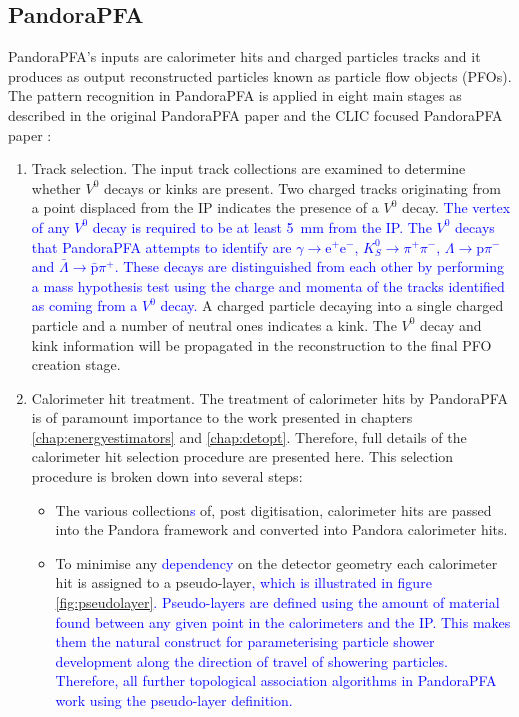 \subsection{PandoraPFA}
PandoraPFA's inputs are calorimeter hits and charged particles tracks and it produces as output reconstructed particles known as particle flow objects (PFOs).  The pattern recognition in PandoraPFA is applied in eight main stages as described in the original PandoraPFA paper \cite{arXiv:0907.3577} and the CLIC focused PandoraPFA paper \cite{arXiv:1209.4039}:
\begin{enumerate}
\item Track selection.  The input track collections are examined to determine whether $V^{0}$ decays or kinks are present.  Two charged tracks originating from a point displaced from the IP indicates the presence of a $V^{0}$ decay.  \textcolor{blue}{The vertex of any $V^{0}$ decay is required to be at least 5~mm from the IP.  The $V^{0}$ decays that PandoraPFA attempts to identify are $\gamma \rightarrow \text{e}^{+}\text{e}^{-}$, $K^{0}_{S} \rightarrow \pi^{+}\pi^{-}$, $\Lambda \rightarrow \text{p}\pi^{-}$ and $\bar{\Lambda} \rightarrow \bar{\text{p}}\pi^{+}$.  These decays are distinguished from each other by performing a mass hypothesis test using the charge and momenta of the tracks identified as coming from a $V^{0}$ decay.} A charged particle decaying into a single charged particle and a number of neutral ones indicates a kink.  The $V^{0}$ decay and kink information will be propagated in the reconstruction to the final PFO creation stage.  
\item Calorimeter hit treatment.  The treatment of calorimeter hits by PandoraPFA is of paramount importance to the work presented in chapters \ref{chap:energyestimators} and \ref{chap:detopt}.  Therefore, full details of the calorimeter hit selection procedure are presented here.  This selection procedure is broken down into several steps:
\begin{itemize}
\item The various collection\textcolor{blue}{s} of, post digitisation, calorimeter hits are passed into the Pandora framework and converted into Pandora calorimeter hits.  
\item To minimise any \textcolor{blue}{dependency} on the detector geometry each calorimeter hit is assigned to a pseudo-layer\textcolor{blue}{, which is illustrated in figure \ref{fig:pseudolayer}.  Pseudo-layers are defined using the amount of material found between any given point in the calorimeters and the IP.  This makes them the natural construct for parameterising particle shower development along the direction of travel of showering particles.  Therefore, all further topological association algorithms in PandoraPFA work using the pseudo-layer definition.}

\end{itemize}
\end{enumerate}
